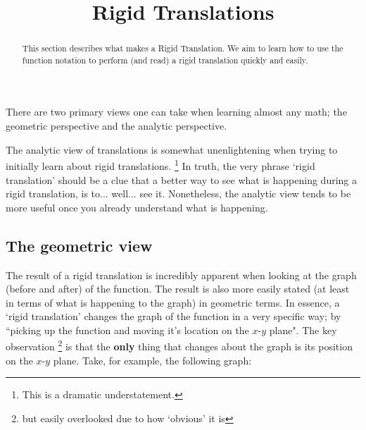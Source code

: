 \documentclass{ximeraXloud}
\title{Rigid Translations}
\begin{document}
\begin{abstract}
    This section describes what makes a Rigid Translation. We aim to learn how to use the function notation to perform (and read) a rigid translation quickly and easily.
\end{abstract}
\maketitle

There are two primary views one can take when learning almost any math; the geometric perspective and the analytic perspective.

The analytic view of translations is somewhat unenlightening when trying to initially learn about rigid translations.%
\footnote{%
    This is a dramatic understatement.%
    }
In truth, the very phrase `rigid translation' should be a clue that a better way to see what is happening during a rigid translation, is to... well... see it. Nonetheless, the analytic view tends to be more useful once you already understand what is happening.

\subsection*{The geometric view}
    The result of a rigid translation is incredibly apparent when looking at the graph (before and after) of the function. The result is also more easily stated (at least in terms of what is happening to the graph) in geometric terms. In essence, a `rigid translation' changes the graph of the function in a very specific way; by ``picking up the function and moving it's location on the $x$-$y$ plane". The key observation%
    \footnote{%
        but easily overlooked due to how `obvious' it is%
        }
    is that the \textbf{only} thing that changes about the graph is its position on the $x$-$y$ plane. Take, for example, the following graph:
    
    \begin{minipage}{\textwidth}
        \begin{center}
        \end{center}
    \end{minipage}
    
\end{document}
